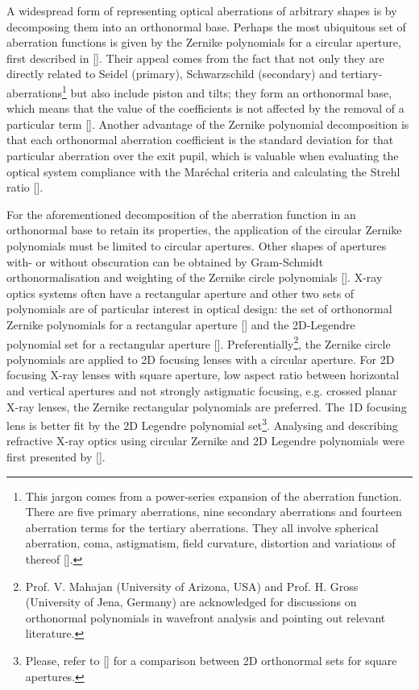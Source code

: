\begin{refsection}
A widespread form of representing optical aberrations of arbitrary shapes is by decomposing them into an orthonormal base. Perhaps the most ubiquitous set of aberration functions is given by the Zernike polynomials for a circular aperture, first described in [\cite{Zernike1934}]. Their appeal comes from the fact that not only they are directly related to Seidel (primary), Schwarzschild (secondary) and tertiary-aberrations\footnote{This jargon comes from a power-series expansion of the aberration function. There are five primary aberrations, nine secondary aberrations and fourteen aberration terms for the tertiary aberrations. They all involve spherical aberration, coma, astigmatism, field curvature, distortion and variations of thereof [\cite{Mahajan2013}].} but also include piston and tilts; they form an orthonormal base, which means that the value of the coefficients is not affected by the removal of a particular term [\cite{Mahajan2007}]. Another advantage of the Zernike polynomial decomposition is that each orthonormal aberration coefficient is the standard deviation for that particular aberration over the exit pupil, which is valuable when evaluating the optical system compliance with the  Mar\'echal criteria and calculating the Strehl ratio [\cite{Mahajan1983}].

For the aforementioned decomposition of the aberration function in an orthonormal base to retain its properties, the application of the circular Zernike polynomials must be limited to circular apertures. Other shapes of apertures with- or without obscuration can be obtained by Gram-Schmidt orthonormalisation and weighting of the Zernike circle polynomials [\cite{Swantner1994,Mahajan1995}]. X-ray optics systems often have a rectangular aperture and other two sets of polynomials are of particular interest in optical design: the set of orthonormal Zernike polynomials for a rectangular aperture  [\cite{Mahajan2007, Mahajan2012}] and the 2D-Legendre polynomial set for a rectangular aperture [\cite{Mahajan2010}]. Preferentially\footnote{Prof. V. Mahajan (University of Arizona, USA) and Prof. H. Gross (University of Jena, Germany) are acknowledged for discussions on orthonormal polynomials in wavefront analysis and pointing out relevant literature.}, the Zernike circle polynomials are applied to 2D focusing lenses with a circular aperture. For 2D focusing X-ray lenses with square aperture, low aspect ratio between horizontal and vertical apertures and not strongly astigmatic focusing, e.g. crossed planar X-ray lenses, the Zernike rectangular polynomials are preferred. The 1D focusing lens is better fit by the 2D Legendre polynomial set\footnote{Please, refer to [\cite{Ye2014}] for a comparison between 2D orthonormal sets for square apertures.}. Analysing and describing refractive X-ray optics using circular Zernike and 2D Legendre polynomials were first presented by [\cite{Koch2016}]. 


\end{refsection}
